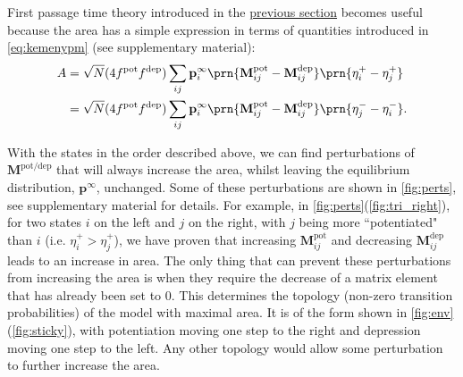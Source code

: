 \documentclass{article} %
\newcommand{\pr}{\mathbf{p}}
\newcommand{\eq}{\pr^\infty}
\newcommand{\M}{\mathbf{M}}
\newcommand{\pot}{^{\text{pot}}}
\newcommand{\dep}{^{\text{dep}}}
\newcommand{\potdep}{^{\text{pot/dep}}}
\begin{document}
First passage time theory introduced in the \hyperref[sec:order]{previous section} becomes useful because the area has a simple expression in terms of quantities introduced in \eqref{eq:kemenypm} (see supplementary material):
%
\begin{equation}\label{eq:areaEta}
\begin{aligned}
  A &= \sqrt{N}(4f\pot f\dep) \sum_{ij} \eq_i \prn{\M\pot_{ij}-\M\dep_{ij}} \prn{\eta^+_i-\eta^+_j}\\
    &= \sqrt{N}(4f\pot f\dep) \sum_{ij} \eq_i \prn{\M\pot_{ij}-\M\dep_{ij}} \prn{\eta^-_j-\eta^-_i}.
\end{aligned}
\end{equation}
%


With the states in the order described above, we can find perturbations of $\M\potdep$ that will always increase the area, whilst leaving the equilibrium distribution, $\eq$, unchanged.
Some of these perturbations are shown in \autoref{fig:perts}, see supplementary material for details.
For example, in \autoref{fig:perts}(\ref{fig:tri_right}), for two states $i$ on the left and $j$ on the right, with $j$ being more ``potentiated" than $i$ (i.e. $\eta^+_i > \eta^+_j$), we have proven that increasing $\M\pot_{ij}$ and decreasing $\M\dep_{ij}$ leads to an increase in area.
The only thing that can prevent these perturbations from increasing the area is when they require the decrease of a matrix element that has already been set to 0.
This determines the topology (non-zero transition probabilities) of the model with maximal area.
It is of the form shown in \autoref{fig:env}(\ref{fig:sticky}),%
with potentiation moving one step to the right and depression moving one step to the left.
Any other topology would allow some perturbation to further increase the area.
\end{document}
